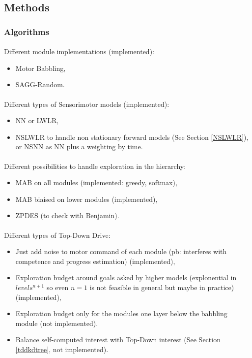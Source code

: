 \documentclass[12pt]{article}
\begin{document}
	
	\subsection{Methods}
		
		\subsubsection{Algorithms}
		
			\paragraph{}
			Different module implementations (implemented):
			\begin{itemize}
				\item Motor Babbling,
				\item SAGG-Random.
			\end{itemize}
			
			\paragraph{}
			Different types of Sensorimotor models (implemented):
			\begin{itemize}
				\item NN or LWLR,
				\item NSLWLR to handle non stationary forward models (See Section \ref{NSLWLR}), or NSNN as NN plus a weighting by time.
			\end{itemize}
			
			\paragraph{}
			Different possibilities to handle exploration in the hierarchy:
			\begin{itemize}
				\item MAB on all modules (implemented: greedy, softmax),
				\item MAB biaised on lower modules (implemented),
				\item ZPDES (to check with Benjamin).
			\end{itemize}
			
			\paragraph{}
			Different types of Top-Down Drive:
			\begin{itemize}
				\item Just add noise to motor command of each module (pb: interferes with competence and progress estimation)  (implemented),
				\item Exploration budget around goals asked by higher models (explonential in $levels^{n+1}$ so even $n=1$ is not feasible in general but maybe in practice)  (implemented),
				\item Exploration budget only for the modules one layer below the babbling module (not implemented).
				\item Balance self-computed interest with Top-Down interest (See Section \ref{tddkdtree}, not implemented).
			\end{itemize}
			
\end{document}
